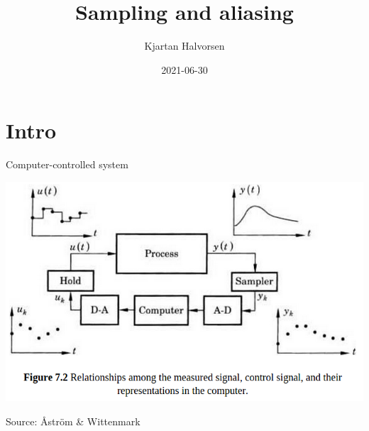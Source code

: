 \documentclass[presentation,aspectratio=169]{beamer}
\author{Kjartan Halvorsen}
\date{2021-06-30}
\title{Sampling and aliasing}
\begin{document}
\maketitle

\section{Intro}
\label{sec:org685c9c4}

\begin{frame}[label={sec:orgcd3f3cb}]{Computer-controlled system}
\begin{center}
\includegraphics[width=0.7\linewidth]{../../figures/fig7-2.png}
\end{center}
{\footnotesize Source: Åström \& Wittenmark}
\end{frame}
\end{document}
